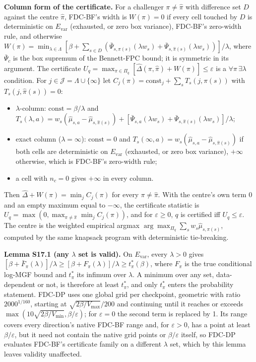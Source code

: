 \documentclass[sigconf,anonymous,review]{acmart}
\newcommand{\eps}{\varepsilon}
\begin{document}
\textbf{Column form of the certificate.} For a challenger $\pi \ne \hat\pi$ with difference set $D$ against the centre $\hat\pi$, FDC-BF's width is $W(\pi) = 0$ if every cell touched by $D$ is deterministic on $E_{\text{var}}$ (exhausted, or zero box variance), FDC-BF's zero-width rule, and otherwise $W(\pi) = \min_{\lambda\in\Lambda} [\beta + \sum_{s\in D} (\bar\Psi_{s,\pi(s)}(\lambda w_s) + \bar\Psi_{s,\hat\pi(s)}(\lambda w_s))]/\lambda$, where $\bar\Psi_c$ is the box supremum of the Bennett-FPC bound; it is symmetric in its argument. The certificate $U_q = \max_{\pi \in \Pi_q} [\hat\Delta(\pi,\hat\pi) + W(\pi)] \le \eps$ is a $\forall\pi\,\exists\lambda$ condition. For $j \in \mathcal{J} = \Lambda \cup \{\infty\}$ let $C_j(\pi) = \mathrm{const}_j + \sum_s T_s(j, \pi(s))$ with $T_s(j, \hat\pi(s)) = 0$:
\begin{itemize}
\item $\lambda$-column: $\mathrm{const} = \beta/\lambda$ and $T_s(\lambda, a) = w_s(\hat\mu_{s,a} - \hat\mu_{s,\hat\pi(s)}) + [\bar\Psi_{s,a}(\lambda w_s) + \bar\Psi_{s,\hat\pi(s)}(\lambda w_s)]/\lambda$;
\item exact column ($\lambda = \infty$): $\mathrm{const} = 0$ and $T_s(\infty, a) = w_s(\hat\mu_{s,a} - \hat\mu_{s,\hat\pi(s)})$ if both cells are deterministic on $E_{\text{var}}$ (exhausted, or zero box variance), $+\infty$ otherwise, which is FDC-BF's zero-width rule;
\item a cell with $n_c = 0$ gives $+\infty$ in every column.
\end{itemize}
Then $\hat\Delta + W(\pi) = \min_j C_j(\pi)$ for every $\pi \ne \hat\pi$. With the centre's own term 0 and an empty maximum equal to $-\infty$, the certificate statistic is $U_q = \max(0, \max_{\pi \ne \hat\pi} \min_j C_j(\pi))$, and for $\eps \ge 0$, $q$ is certified iff $U_q \le \eps$. The centre is the weighted empirical argmax $\arg\max_{\Pi_q} \sum_s w_s \hat\mu_{s,\pi(s)}$, computed by the same knapsack program with deterministic tie-breaking.

\textbf{Lemma S17.1 (any $\lambda$ set is valid).} On $E_{\text{var}}$, every $\lambda > 0$ gives $[\beta + \bar F_\pi(\lambda)]/\lambda \ge [\beta + F_\pi(\lambda)]/\lambda \ge t^*_\pi(\beta)$, where $F_\pi$ is the true conditional log-MGF bound and $t^*_\pi$ its infimum over $\lambda$. A minimum over any set, data-dependent or not, is therefore at least $t^*_\pi$, and only $t^*_\pi$ enters the probability statement. FDC-DP uses one global grid per checkpoint, geometric with ratio $2000^{1/160}$, starting at $\sqrt{2\beta/V_{\max}}/200$ and continuing until it reaches or exceeds $\max(10\sqrt{2\beta/V_{\min}}, \beta/\eps)$; for $\eps = 0$ the second term is replaced by 1. Its range covers every direction's native FDC-BF range and, for $\eps > 0$, has a point at least $\beta/\eps$, but it need not contain the native grid points or $\beta/\eps$ itself, so FDC-DP evaluates FDC-BF's certificate family on a different $\lambda$ set, which by this lemma leaves validity unaffected.
\end{document}

